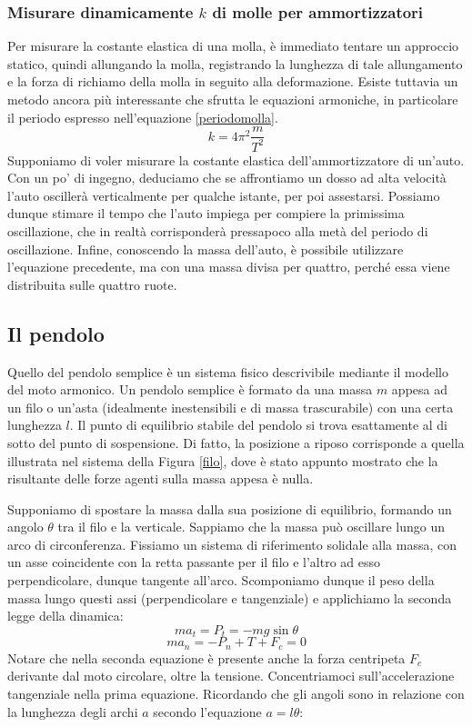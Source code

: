 \subsubsection*{Misurare dinamicamente $k$ di molle per ammortizzatori}
Per misurare la costante elastica di una molla, è immediato tentare un approccio
statico, quindi allungando la molla, registrando la lunghezza di tale allungamento
e la forza di richiamo della molla in seguito alla deformazione. Esiste tuttavia
un metodo ancora più interessante che sfrutta le equazioni armoniche, in particolare
il periodo espresso nell'equazione \ref{periodomolla}.
\[ k = 4\pi^2\frac{m}{T^2} \]
Supponiamo di voler misurare la costante elastica dell'ammortizzatore di un'auto.
Con un po' di ingegno, deduciamo che se affrontiamo un dosso ad alta velocità
l'auto oscillerà verticalmente per qualche istante, per poi assestarsi. Possiamo
dunque stimare il tempo che l'auto impiega per compiere la primissima oscillazione,
che in realtà corrisponderà pressapoco alla metà del periodo di oscillazione.
Infine, conoscendo la massa dell'auto, è possibile utilizzare l'equazione precedente,
ma con una massa divisa per quattro, perché essa viene distribuita sulle quattro
ruote.



\subsection{Il pendolo}
Quello del pendolo semplice è un sistema fisico descrivibile mediante
il modello del moto armonico. Un pendolo semplice è formato da una massa
$m$ appesa ad un filo o un'asta (idealmente inestensibili e di massa
trascurabile) con una certa lunghezza $l$. Il punto di equilibrio stabile del pendolo si trova
esattamente al di sotto del punto di sospensione. Di fatto, la posizione
a riposo corrisponde a quella illustrata nel sistema della Figura
\ref{filo}, dove è stato appunto mostrato che la risultante delle
forze agenti sulla massa appesa è nulla.

Supponiamo di spostare la massa dalla sua posizione di equilibrio,
formando un angolo $\theta$ tra il filo e la verticale. Sappiamo che
la massa può oscillare lungo un arco di circonferenza. Fissiamo un
sistema di riferimento solidale alla massa, con un asse coincidente con
la retta passante per il filo e l'altro ad esso perpendicolare, dunque
tangente all'arco. Scomponiamo dunque il peso della massa lungo questi
assi (perpendicolare e tangenziale)  e applichiamo la seconda legge della
dinamica:
\[ ma_t = P_t = -mg\sin\theta \]
\[ ma_n = - P_n + T + F_c = 0 \]
Notare che nella seconda equazione è presente anche la forza centripeta
$F_c$ derivante dal moto circolare, oltre la tensione. Concentriamoci
sull'accelerazione tangenziale nella prima equazione. Ricordando che gli
angoli sono in relazione con la lunghezza degli archi $a$ secondo
l'equazione $a = l\theta$:

